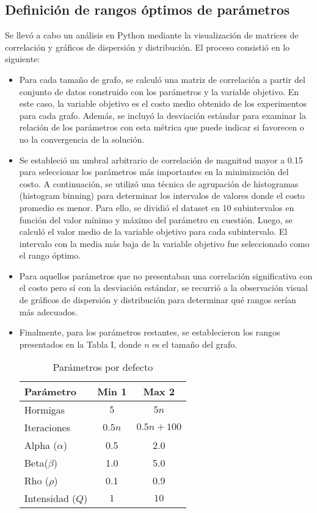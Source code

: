 \documentclass[conference]{IEEEtran}
\begin{document}
\subsection{Definición de rangos óptimos de parámetros}
Se llevó a cabo un análisis en Python mediante la visualización de matrices de correlación y gráficos de dispersión y distribución. El proceso consistió en lo siguiente:
\begin{itemize}
\item Para cada tamaño de grafo, se calculó una matriz de correlación a partir del conjunto de datos construido con los parámetros y la variable objetivo. En este caso, la variable objetivo es el costo medio obtenido de los experimentos para cada grafo. Además, se incluyó la desviación estándar para examinar la relación de los parámetros con esta métrica que puede indicar si favorecen o no la convergencia de la solución.
\item Se estableció un umbral arbitrario de correlación de magnitud mayor a 0.15 para seleccionar los parámetros más importantes en la minimización del costo. A continuación, se utilizó una técnica de agrupación de histogramas (histogram binning) para determinar los intervalos de valores donde el costo promedio es menor. Para ello, se dividió el dataset en 10 subintervalos en función del valor mínimo y máximo del parámetro en cuestión. Luego, se calculó el valor medio de la variable objetivo para cada subintervalo. El intervalo con la media más baja de la variable objetivo fue seleccionado como el rango óptimo.
\item Para aquellos parámetros que no presentaban una correlación significativa con el costo pero sí con la desviación estándar, se recurrió a la observación visual de gráficos de dispersión y distribución para determinar qué rangos serían más adecuados.
\item Finalmente, para los parámetros restantes, se establecieron los rangos presentados en la Tabla I, donde $n$ es el tamaño del grafo.

\begin{table}[h]
  \centering
  \begin{tabular}{|l|c|c|}
    \hline
    Parámetro & Min 1 & Max 2 \\
    \hline
    Hormigas & $5$ & $5n$ \\
    \hline
    Iteraciones & $0.5n$ & $0.5n + 100$ \\
    \hline
    Alpha ($\alpha$) & 0.5 & 2.0 \\
    \hline
    Beta($\beta$) & 1.0 & 5.0 \\
    \hline
    Rho ($\rho$) & 0.1 & 0.9 \\
    \hline
    Intensidad ($Q$) & $1$ & $10$ \\
    \hline
  \end{tabular}
  \caption{Parámetros por defecto}
  \label{tab:table1}
\end{table}
\end{itemize}
\end{document}

